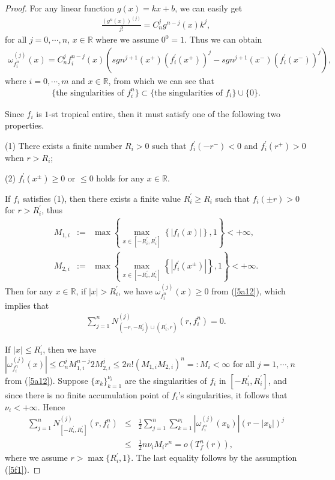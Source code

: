 \documentclass[10pt,a4paper]{amsart}
\begin{document}
\begin{proof}
    For any linear function $g(x)=kx+b$, we can easily get 
    \begin{eqnarray*}
        \frac{(g^{n}(x))^{(j)}}{j!}=C_{n}^{j}g^{n-j}(x)k^{j},
    \end{eqnarray*}
    for all $j=0, \cdots, n$, $x\in\mathbb{R}$ where we assume $0^{0}=1$. Thus we can obtain
    \begin{eqnarray}\label{5a12}
        \omega_{f_{i}^{n}}^{(j)}(x)=C_{n}^{j}f_{i}^{n-j}(x)\left(sgn^{j+1}(x^{+})(f_{i}^{'}(x^{+}))^{j}-sgn^{j+1}(x^{-})(f_{i}^{'}(x^{-}))^{j}\right),
    \end{eqnarray}
    where $i=0, \cdots, m$ and $x\in\mathbb{R}$, from which we can see that
    \begin{eqnarray*}
        \{\text{the singularities of } f_{i}^{n}\}\subset\{\text{the singularities of } f_{i}\}\cup \{0\}.
    \end{eqnarray*}

    Since $f_{i}$ is $1$-st tropical entire, then it must satisfy one of the following two properties.

    (1) There exists a finite number $R_{i}>0$ such that $f_{i}^{'}(-r^{-})<0$ and $f_{i}^{'}(r^{+})>0$ when $r>R_{i}$;

    (2) $f_{i}^{'}(x^{\pm})\geq 0$ or $\leq 0$ holds for any $x\in\mathbb{R}$.

    If $f_{i}$ satisfies (1), then there exists a finite value $R_{i}^{'}\geq R_{i}$ such that $f_{i}(\pm r)>0$ for $r>R_{i}^{'}$, thus
    \begin{eqnarray*}
        M_{1, i}&:=&\max\left\{\max\limits_{x\in[-R_{i}^{'}, R_{i}^{'}]}\left\{|f_{i}(x)|\right\}, 1\right\}<+\infty,\\
        M_{2, i}&:=&\max\left\{\max\limits_{x\in[-R_{i}^{'}, R_{i}^{'}]}\left\{|f_{i}^{'}(x^{\pm})|\right\}, 1\right\}<+\infty.
    \end{eqnarray*}
    Then for any $x\in \mathbb{R}$, if $|x|> R_{i}^{'}$, we have $\omega_{f_{i}^{n}}^{(j)}(x)\geq 0$ from (\ref{5a12}), which implies that 
    \begin{eqnarray}\label{5a13}
      \sum_{j=1}^{n}N_{(-r, -R_{i}^{'})\cup (R_{i}^{'}, r)}^{(j)}(r, f_{i}^{n})=0.
    \end{eqnarray}
    
    If $|x|\leq R_{i}^{'}$, then we have $|\omega_{f_{i}^{n}}^{(j)}(x)|\leq C_{n}^{j}M_{1, i}^{n-j}2M_{2, i}^{j}\leq 2n!(M_{1, i}M_{2, i})^{n}=:M_{i}<\infty$ for all $j=1, \cdots, n$ from (\ref{5a12}). Suppose $\{x_{k}\}_{k=1}^{\nu_{i}}$ are the singularities of $f_{i}$ in $[-R_{i}^{'}, R_{i}^{'}]$, and since there is no finite accumulation point of $f_{i}$'s singularities, it follows that $\nu_{i}<+\infty$. Hence
    \begin{eqnarray}\label{5a14}
        \sum_{j=1}^{n}N_{[-R_{i}^{'}, R_{i}^{'}]}^{(j)}(r, f_{i}^{n})&\leq& \frac{1}{2}\sum_{j=1}^{n}\sum_{k=1}^{\nu_{i}}|\omega_{f_{i}^{n}}^{(j)}(x_{k})|(r-|x_{k}|)^{j}\nonumber\\
        &\leq& \frac{1}{2}n\nu_{i}M_{i}r^{n}=o(T_{f}^{n}(r)),
    \end{eqnarray}
    where we assume $r>\max\{R_{i}^{'}, 1\}$. The last equality follows by the assumption (\ref{5f1}).
    

\end{proof}
\end{document}
